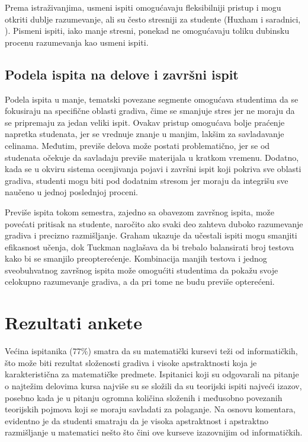 \documentclass[a4paper]{article}
\begin{document}
Prema istraživanjima, usmeni ispiti omogućavaju fleksibilniji pristup i mogu otkriti dublje razumevanje, ali su često stresniji za studente (Huxham i saradnici, \cite{huxham2010oral}). Pismeni ispiti, iako manje stresni, ponekad ne omogućavaju toliku dubinsku procenu razumevanja kao usmeni ispiti.

\subsection{Podela ispita na delove i završni ispit}

Podela ispita u manje, tematski povezane segmente omogućava studentima da se fokusiraju na specifične oblasti gradiva, čime se smanjuje stres jer ne moraju da se pripremaju za jedan veliki ispit. Ovakav pristup omogućava bolje praćenje napretka studenata, jer se vrednuje znanje u manjim, lakšim za savladavanje celinama. Međutim, previše delova može postati problematično, jer se od studenata očekuje da savladaju previše materijala u kratkom vremenu. Dodatno, kada se u okviru sistema ocenjivanja pojavi i završni ispit koji pokriva sve oblasti gradiva, studenti mogu biti pod dodatnim stresom jer moraju da integrišu sve naučeno u jednoj poslednjoj proceni.

Previše ispita tokom semestra, zajedno sa obavezom završnog ispita, može povećati pritisak na studente, naročito ako svaki deo zahteva duboko razumevanje gradiva i precizno razmišljanje. Graham \cite{graham1999practice} ukazuje da učestali ispiti mogu smanjiti efikasnost učenja, dok Tuckman \cite{tuckman1998benefits} naglašava da bi trebalo balansirati broj testova kako bi se smanjilo preopterećenje. Kombinacija manjih testova i jednog sveobuhvatnog završnog ispita može omogućiti studentima da pokažu svoje celokupno razumevanje gradiva, a da pri tome ne budu previše opterećeni.

\section{Rezultati ankete}

Većina ispitanika (77\%) smatra da su matematički kursevi teži od informatičkih, što može biti rezultat složenosti gradiva i visoke apstraktnosti koja je karakteristična za matematičke predmete. Ispitanici koji su odgovarali na pitanje o najtežim delovima kursa najviše su se složili da su teorijski ispiti najveći izazov, posebno kada je u pitanju ogromna količina složenih i međusobno povezanih teorijskih pojmova koji se moraju savladati za polaganje. Na osnovu komentara, evidentno je da studenti smatraju da je visoka apstraktnost i apstraktno razmišljanje u matematici nešto što čini ove kurseve izazovnijim od informatičkih.
\end{document}
